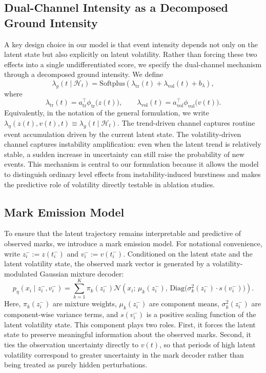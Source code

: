 \documentclass[11pt]{article}
\theoremstyle{definition}
\numberwithin{equation}{section}
\numberwithin{theorem}{section}
\numberwithin{proposition}{section}
\numberwithin{lemma}{section}
\numberwithin{corollary}{section}
\numberwithin{definition}{section}
\numberwithin{remark}{section}
\newcommand{\1}{\mathbbm{1}}
\begin{document}
\subsection{Dual-Channel Intensity as a Decomposed Ground Intensity}

A key design choice in our model is that event intensity depends not only on the latent state but also explicitly on latent volatility. 
Rather than forcing these two effects into a single undifferentiated score, we specify the dual-channel mechanism through a decomposed ground intensity. 
We define
\begin{equation}
\label{eq:dual_channel_intensity}
\lambda_g(t\mid \mathcal H_t)
=
\mathrm{Softplus}\!\left(
\lambda_{\mathrm{tr}}(t)
+
\lambda_{\mathrm{vol}}(t)
+
 b_{\lambda}
\right),
\end{equation}
where
\begin{equation}
\label{eq:decomposed_channels}
\lambda_{\mathrm{tr}}(t)=a_{\mathrm{tr}}^{\top}\phi_{\mathrm{tr}}\bigl(z(t)\bigr),
\qquad
\lambda_{\mathrm{vol}}(t)=a_{\mathrm{vol}}^{\top}\phi_{\mathrm{vol}}\bigl(v(t)\bigr).
\end{equation}
Equivalently, in the notation of the general formulation, we write $\lambda_{\eta}(z(t),v(t),t)\equiv \lambda_g(t\mid \mathcal H_t)$. 
The trend-driven channel captures routine event accumulation driven by the current latent state. 
The volatility-driven channel captures instability amplification: even when the latent trend is relatively stable, a sudden increase in uncertainty can still raise the probability of new events. 
This mechanism is central to our formulation because it allows the model to distinguish ordinary level effects from instability-induced burstiness and makes the predictive role of volatility directly testable in ablation studies.

\subsection{Mark Emission Model}

To ensure that the latent trajectory remains interpretable and predictive of observed marks, we introduce a mark emission model. 
For notational convenience, write $z_i^-:=z(t_i^-)$ and $v_i^-:=v(t_i^-)$. 
Conditioned on the latent state and the latent volatility state, the observed mark vector is generated by a volatility-modulated Gaussian mixture decoder:
\begin{equation}
\label{eq:mark_decoder}
p_{\eta}(x_i \mid z_i^-, v_i^-)
=
\sum_{k=1}^{K} \pi_k(z_i^-)
\mathcal{N}\!\left(
x_i;\,\mu_k(z_i^-),\,\mathrm{Diag}\bigl(\sigma_k^2(z_i^-)\cdot s(v_i^-)\bigr)
\right).
\end{equation}
Here, $\pi_k(z_i^-)$ are mixture weights, $\mu_k(z_i^-)$ are component means, $\sigma_k^2(z_i^-)$ are component-wise variance terms, and $s(v_i^-)$ is a positive scaling function of the latent volatility state. 
This component plays two roles. 
First, it forces the latent state to preserve meaningful information about the observed marks. 
Second, it ties the observation uncertainty directly to $v(t)$, so that periods of high latent volatility correspond to greater uncertainty in the mark decoder rather than being treated as purely hidden perturbations.
\end{document}
